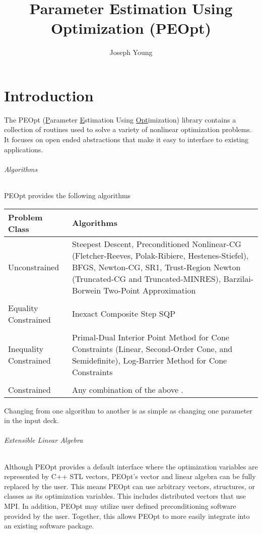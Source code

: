 \documentclass{report}
\title{Parameter Estimation Using Optimization (PEOpt)}
\author{Joseph Young}
\begin{document}
\maketitle
\tableofcontents

\chapter{Introduction}

        The PEOpt (\underline{P}arameter \underline{E}stimation Using \underline{Opt}imization) library contains a collection of routines used to solve a variety of nonlinear optimization problems.  It focuses on open ended abstractions that make it easy to interface to existing applications.

\subparagraph{Algorithms}
        PEOpt provides the following algorithms 
\begin{center}\begin{tabular}{l|p{}}
Problem Class & Algorithms\\\hline
Unconstrained & Steepest Descent, Preconditioned Nonlinear-CG (Fletcher-Reeves, Polak-Ribiere, Hestenes-Stiefel), BFGS, Newton-CG, SR1, Trust-Region Newton (Truncated-CG and Truncated-MINRES), Barzilai-Borwein Two-Point Approximation\\\\
Equality Constrained & Inexact Composite Step SQP\\\\
Inequality Constrained & Primal-Dual Interior Point Method for Cone Constraints (Linear, Second-Order Cone, and Semidefinite), Log-Barrier Method for Cone Constraints\\\\
Constrained & Any combination of the above .
\end{tabular}\end{center}
Changing from one algorithm to another is as simple as changing one parameter in the input deck.

\subparagraph{Extensible Linear Algebra}
Although PEOpt provides a default interface where the optimization variables are represented by C++ STL vectors, PEOpt's vector and linear algebra can be fully replaced by the user.  This means PEOpt can use arbitrary vectors, structures, or classes as its optimization variables.  This includes distributed vectors that use MPI.  In addition, PEOpt may utilize user defined preconditioning software provided by the user.  Together, this allows PEOpt to more easily integrate into an existing software package.
\end{document}
